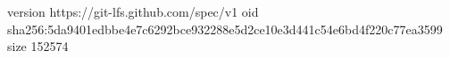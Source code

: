 version https://git-lfs.github.com/spec/v1
oid sha256:5da9401edbbe4e7c6292bce932288e5d2ce10e3d441c54e6bd4f220c77ea3599
size 152574
